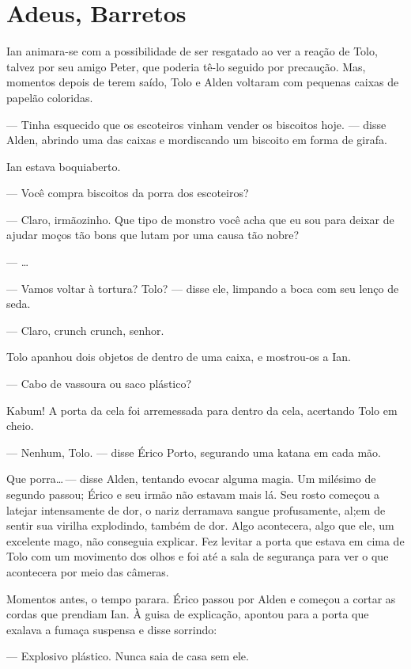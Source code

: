 \chapter{Adeus, Barretos}

Ian animara-se com a possibilidade de ser resgatado ao ver a reação de Tolo,
talvez por seu amigo Peter, que poderia tê-lo seguido por precaução. Mas,
momentos depois de terem saído, Tolo e Alden voltaram com pequenas caixas de
papelão coloridas.

--- Tinha esquecido que os escoteiros vinham vender os biscoitos hoje. ---
disse Alden, abrindo uma das caixas e mordiscando um biscoito em forma de
girafa.

Ian estava boquiaberto.

--- Você compra biscoitos da porra dos escoteiros?

--- Claro, irmãozinho. Que tipo de monstro você acha que eu sou para deixar de
ajudar moços tão bons que lutam por uma causa tão nobre?

--- \ldots

--- Vamos voltar à tortura? Tolo? --- disse ele, limpando a boca com seu lenço
de seda.

--- Claro, crunch crunch, senhor.

Tolo apanhou dois objetos de dentro de uma caixa, e mostrou-os a Ian.

--- Cabo de vassoura ou saco plástico?

Kabum! A porta da cela foi arremessada para dentro da cela, acertando Tolo em
cheio.

--- Nenhum, Tolo. --- disse Érico Porto, segurando uma katana em cada mão.

Que porra\ldots\,--- disse Alden, tentando evocar alguma magia. Um milésimo de
segundo passou; Érico e seu irmão não estavam mais lá. Seu rosto começou a
latejar intensamente de dor, o nariz derramava sangue profusamente, al;em de
sentir sua virilha explodindo, também de dor. Algo acontecera, algo que ele, um
excelente mago, não conseguia explicar. Fez levitar a porta que estava em cima
de Tolo com um movimento dos olhos e foi até a sala de segurança para ver o que
acontecera por meio das câmeras.

Momentos antes, o tempo parara. Érico passou por Alden e começou a cortar as
cordas que prendiam Ian. À guisa de explicação, apontou para a porta que
exalava a fumaça suspensa e disse sorrindo:

--- Explosivo plástico. Nunca saia de casa sem ele.

